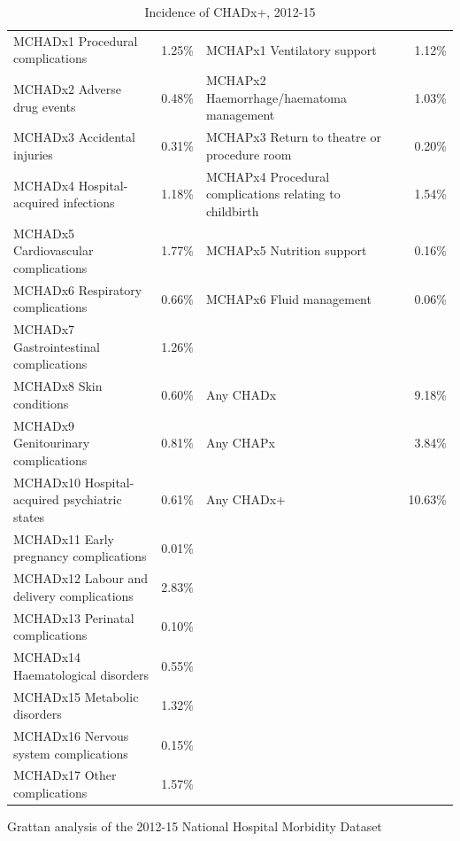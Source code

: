 \documentclass[FrontPage]{grattan}
\begin{document}
\begin{table}
\caption{Incidence of CHADx+, 2012-15}\label{tbl:incidence-CHADx}
\begin{tabularx}{\linewidth}{lRlR}
\toprule
MCHADx1 Procedural complications              & 1.25\% & MCHAPx1 Ventilatory support                             & 1.12\%\tabularnewline
MCHADx2 Adverse drug events                   & 0.48\% & MCHAPx2 Haemorrhage/haematoma management                & 1.03\%\tabularnewline
MCHADx3 Accidental injuries                   & 0.31\% & MCHAPx3 Return to theatre or procedure room             & 0.20\%\tabularnewline
MCHADx4 Hospital-acquired infections          & 1.18\% & MCHAPx4 Procedural complications relating to childbirth & 1.54\%\tabularnewline
MCHADx5 Cardiovascular complications          & 1.77\% & MCHAPx5 Nutrition support                               & 0.16\%\tabularnewline
MCHADx6 Respiratory complications             & 0.66\% & MCHAPx6 Fluid management                                 & 0.06\%\tabularnewline
MCHADx7 Gastrointestinal complications        & 1.26\% &                                                         & \tabularnewline
MCHADx8 Skin conditions                       & 0.60\% & Any CHADx                                               & 9.18\%\tabularnewline
MCHADx9 Genitourinary complications           & 0.81\% & Any CHAPx                                               & 3.84\%\tabularnewline
MCHADx10 Hospital-acquired psychiatric states & 0.61\% & Any CHADx+                                              & 10.63\%\tabularnewline
MCHADx11 Early pregnancy complications        & 0.01\% &                                                         & \tabularnewline
MCHADx12 Labour and delivery complications    & 2.83\% &                                                         & \tabularnewline
MCHADx13 Perinatal complications              & 0.10\% &                                                         & \tabularnewline
MCHADx14 Haematological disorders             & 0.55\% &                                                         & \tabularnewline
MCHADx15 Metabolic disorders                  & 1.32\% &                                                         & \tabularnewline
MCHADx16 Nervous system complications         & 0.15\% &                                                         & \tabularnewline
MCHADx17 Other complications                  & 1.57\% &                                                         & \tabularnewline
\bottomrule
\end{tabularx}
%
{Grattan analysis of the 2012-15 National Hospital Morbidity Dataset}
\end{table}
\end{document}
